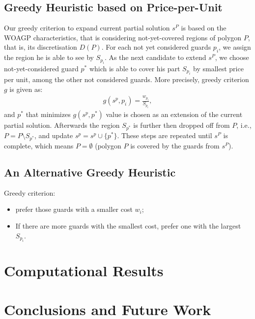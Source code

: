 \documentclass[runningheads,a4paper]{llncs}
\begin{document}
      \subsection{Greedy Heuristic based on Price-per-Unit}
       Our greedy criterion to expand current partial solution $s^P$  is based on the WOAGP characteristics, that is considering not-yet-covered regions of polygon $P$, that is, its discretisation $D(P)$. For each not yet considered guards $p_i$, we assign the region he is able to see by $S_{p_i}$. As the next candidate to extend $s^P$, we choose not-yet-considered guard $p^*$ which is able to cover his part $S_{p_i}$ by smallest price per unit, among the other not considered guards. More precisely, greedy criterion $g$ is given as:
       \begin{align}
            g(s^p, p_i) = \frac{w_{p_i}}{S_{p_i}},
       \end{align}
       and $p^*$ that minimizes $g(s^p, p^*)$ value is chosen as an extension of the current partial solution.
       Afterwards the region $S_{p^*}$ is further then dropped off from $P$, i.e., $P=P \setminus S_{p^*}$, and update $s^p= s^p \cup \{p^*\}$.  These steps are repeated until $s^P$ is complete, which means $P = \emptyset$ (polygon $P$ is covered by the guards from $s^P$).  
        \subsection{An Alternative Greedy Heuristic}
         Greedy criterion: 
          \begin{itemize}
          	\item prefer those guards with a smaller cost $w_i$; 
          	\item If there are more guards with the smallest cost, 
          	prefer one with the largest $S_{p_i}$.
          \end{itemize}
     \section{Computational Results}
     \section{Conclusions and Future Work}
     
     
  
    
    
\end{document}
